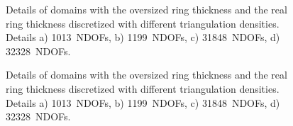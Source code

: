 \documentclass[review,times,3p,10pt]{elsarticle}
\begin{document}
{ \begin{figure}
\centering
{}
 \caption{Details of domains with the oversized ring thickness and the real ring thickness discretized with different triangulation densities. Details a) 1013~NDOFs, b) 1199~NDOFs, c) 31848~NDOFs,  d) 32328~NDOFs. }
 \label{mesh-dens}
\end{figure}

 \begin{figure}
\centering
{}
 \caption{Details of domains with the oversized ring thickness and the real ring thickness discretized with different triangulation densities.  Details a) 1013~NDOFs, b) 1199~NDOFs, c) 31848~NDOFs,  d) 32328~NDOFs.}
 \label{mesh-errs}
\end{figure}

}
\end{document}
